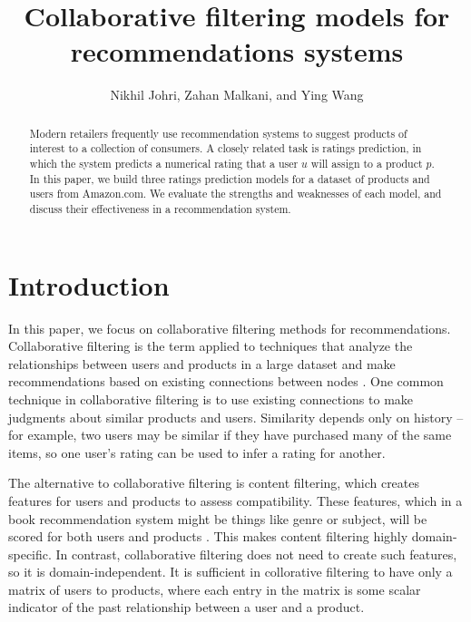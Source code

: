 \documentclass[letterpaper, 11 pt, conference]{ieeeconf}
\title{\LARGE \bf
Collaborative filtering models for recommendations systems
}
\author{Nikhil Johri, Zahan Malkani, and Ying Wang
}
\begin{document}
\maketitle
\thispagestyle{empty}
\pagestyle{empty}


\begin{abstract}
Modern retailers frequently use recommendation systems to suggest products of 
interest to a collection of consumers. A closely related task is ratings 
prediction, in which the system predicts a numerical rating that a 
user $u$ will assign to a product $p$. In this paper, we build three ratings 
prediction models for a dataset of products and users from Amazon.com. We 
evaluate the strengths and weaknesses of each model, and discuss their 
effectiveness in a recommendation system.

\end{abstract}

\section{Introduction}
In this paper, we focus on collaborative filtering methods for recommendations. 
Collaborative filtering is the term applied to techniques that analyze the 
relationships between users and products in a large dataset and make 
recommendations based on existing connections between nodes \cite{bib:recsys}.
One common technique in collaborative filtering is to use existing connections 
to make judgments about similar products and users. Similarity depends only on 
history -- for example, two users may be similar if they have purchased many 
of the same items, so one user's rating can be used to infer a rating for 
another. 

The alternative to collaborative filtering is content filtering, which 
creates features for users and products to assess compatibility. These 
features, which in a book recommendation system might be things like genre or 
subject, will be scored for both users and products \cite{bib:recsys}. This 
makes content filtering highly domain-specific. 
In contrast, collaborative filtering does not need to create such features, 
so it is domain-independent. It is sufficient in collorative filtering to have 
only a matrix of users to products, where each entry in the matrix is some 
scalar indicator of the past relationship between a user and a product.
\end{document}
